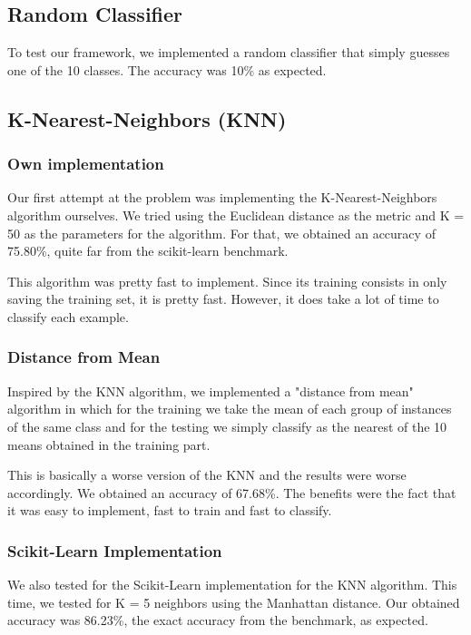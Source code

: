 \documentclass[twoside,twocolumn]{article}
\begin{document}
\subsection{Random Classifier}

To test our framework, we implemented a random classifier that simply guesses one of the 10 classes. The accuracy was 10\% as expected.

\subsection{K-Nearest-Neighbors (KNN)}

\subsubsection{Own implementation}

Our first attempt at the problem was implementing the K-Nearest-Neighbors algorithm ourselves.
We tried using the Euclidean distance as the metric and K = 50 as the parameters for the algorithm.
For that, we obtained an accuracy of 75.80\%, quite far from the scikit-learn benchmark.

This algorithm was pretty fast to implement.
Since its training consists in only saving the training set, it is pretty fast.
However, it does take a lot of time to classify each example.

\subsubsection{Distance from Mean}

Inspired by the KNN algorithm, we implemented a "distance from mean" algorithm in which for the training we
take the mean of each group of instances of the same class and for the testing we simply classify as the nearest
of the 10 means obtained in the training part.

This is basically a worse version of the KNN and the results were worse accordingly.
We obtained an accuracy of 67.68\%.
The benefits were the fact that it was easy to implement, fast to train and fast to classify.

\subsubsection{Scikit-Learn Implementation}

We also tested for the Scikit-Learn implementation for the KNN algorithm.
This time, we tested for K = 5 neighbors using the Manhattan distance.
Our obtained accuracy was 86.23\%, the exact accuracy from the benchmark, as expected.
\end{document}
